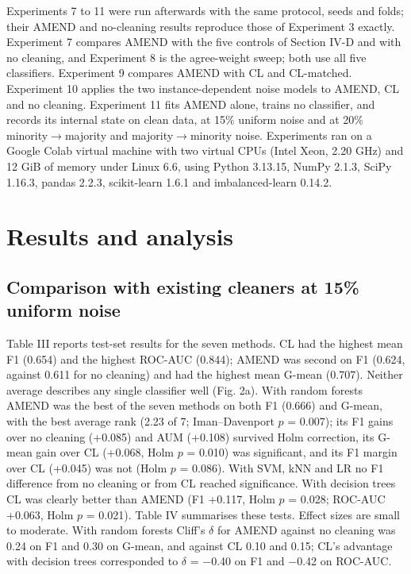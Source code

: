 \documentclass[conference]{IEEEtran}
\begin{document}
Experiments 7 to 11 were run afterwards with the same protocol, seeds and folds; their AMEND and no-cleaning results reproduce those of Experiment 3 exactly. Experiment 7 compares AMEND with the five controls of Section IV-D and with no cleaning, and Experiment 8 is the agree-weight sweep; both use all five classifiers. Experiment 9 compares AMEND with CL and CL-matched. Experiment 10 applies the two instance-dependent noise models to AMEND, CL and no cleaning. Experiment 11 fits AMEND alone, trains no classifier, and records its internal state on clean data, at 15\% uniform noise and at 20\% minority$\rightarrow $majority and majority$\rightarrow $minority noise. Experiments ran on a Google Colab virtual machine with two virtual CPUs (Intel Xeon, 2.20 GHz) and 12 GiB of memory under Linux 6.6, using Python 3.13.15, NumPy 2.1.3, SciPy 1.16.3, pandas 2.2.3, scikit-learn 1.6.1 and imbalanced-learn 0.14.2.

\section{Results and analysis}\label{sec:results-and-analysis}

\subsection{Comparison with existing cleaners at 15\% uniform noise}\label{sec:comparison-with-existing-cleaners-at-15-uniform-noise}

Table III reports test-set results for the seven methods. CL had the highest mean F1 (0.654) and the highest ROC-AUC (0.844); AMEND was second on F1 (0.624, against 0.611 for no cleaning) and had the highest mean G-mean (0.707). Neither average describes any single classifier well (Fig. 2a). With random forests AMEND was the best of the seven methods on both F1 (0.666) and G-mean, with the best average rank (2.23 of 7; Iman--Davenport $p$ = 0.007); its F1 gains over no cleaning (+0.085) and AUM (+0.108) survived Holm correction, its G-mean gain over CL (+0.068, Holm $p$ = 0.010) was significant, and its F1 margin over CL (+0.045) was not (Holm $p$ = 0.086). With SVM, kNN and LR no F1 difference from no cleaning or from CL reached significance. With decision trees CL was clearly better than AMEND (F1 +0.117, Holm $p$ = 0.028; ROC-AUC +0.063, Holm $p$ = 0.021). Table IV summarises these tests. Effect sizes are small to moderate. With random forests Cliff's $\delta $ for AMEND against no cleaning was 0.24 on F1 and 0.30 on G-mean, and against CL 0.10 and 0.15; CL's advantage with decision trees corresponded to $\delta $ = $-$0.40 on F1 and $-$0.42 on ROC-AUC.
\end{document}
